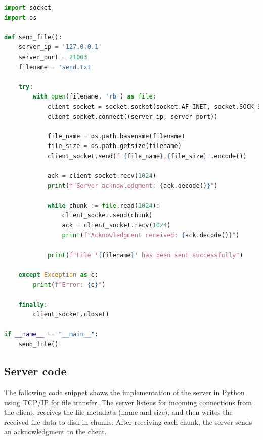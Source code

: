 \documentclass{article}
\begin{document}
\begin{lstlisting}[language=Python]
import socket
import os

def send_file():
    server_ip = '127.0.0.1'
    server_port = 21003
    filename = 'send.txt'

    try:
        with open(filename, 'rb') as file:
            client_socket = socket.socket(socket.AF_INET, socket.SOCK_STREAM)
            client_socket.connect((server_ip, server_port))
            
            file_name = os.path.basename(filename)
            file_size = os.path.getsize(filename)
            client_socket.send(f"{file_name},{file_size}".encode()) 

            ack = client_socket.recv(1024)
            print(f"Server acknowledgment: {ack.decode()}")

            while chunk := file.read(1024):
                client_socket.send(chunk)
                ack = client_socket.recv(1024)  
                print(f"Acknowledgment received: {ack.decode()}")

            print(f"File '{filename}' has been sent successfully")

    except Exception as e:
        print(f"Error: {e}")

    finally:
        client_socket.close()

if __name__ == "__main__":
    send_file()
\end{lstlisting}

\subsection{Server code}
The following code snippet shows the implementation of the server in Python using TCP/IP for file transfer. The server listens for incoming connections from the client, receives the file metadata (name and size), and then writes the received file data to disk in chunks. After receiving each chunk, the server sends an acknowledgment to the client.
\end{document}

